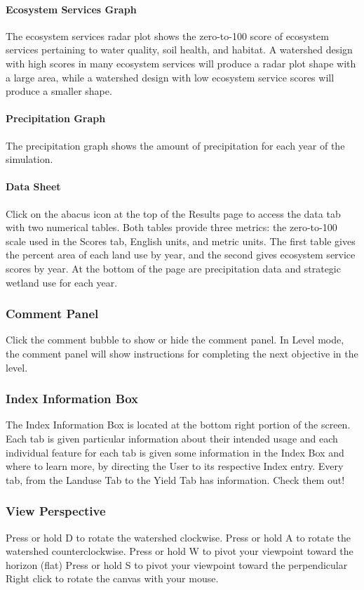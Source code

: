 \documentclass[11pt]{article}
\begin{document}
\begin{itemize}
\paragraph{Ecosystem Services Graph}
The ecosystem services radar plot shows the zero-to-100 score of ecosystem services pertaining to water quality, soil health, and habitat. A watershed design with high scores in many ecosystem services will produce a radar plot shape with a large area, while a watershed design with low ecosystem service scores will produce a smaller shape. 

\paragraph{Precipitation Graph}
The precipitation graph shows the amount of precipitation for each year of the simulation. 

\paragraph{Data Sheet}
Click on the abacus icon at the top of the Results page to access the data tab with two numerical tables. Both tables provide three metrics: the zero-to-100 scale used in the Scores tab, English units, and metric units. The first table gives the percent area of each land use by year, and the second gives ecosystem service scores by year. At the bottom of the page are precipitation data and strategic wetland use for each year. 

\subsubsection{Comment Panel}
Click the comment bubble to show or hide the comment panel. In Level mode, the comment panel will show instructions for completing the next objective in the level. 

\subsubsection{Index Information Box}
The Index Information Box is located at the bottom right portion of the screen. Each tab is given particular information about their intended usage and each individual feature for each tab is given some information in the Index Box and where to learn more, by directing the User to its respective Index entry. Every tab, from the Landuse Tab to the Yield Tab has information. Check them out! 

\subsubsection{View Perspective}
Press or hold D to rotate the watershed clockwise.
Press or hold A to rotate the watershed counterclockwise.
Press or hold W to pivot your viewpoint toward the horizon (flat)
Press or hold S to pivot your viewpoint toward the perpendicular
Right click to rotate the canvas with your mouse.


\end{itemize}
\end{document}

